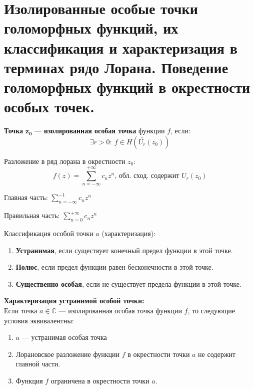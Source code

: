 \newpage
\section{Изолированные особые точки голоморфных функций, их классификация и характеризация в терминах рядо Лорана. Поведение голоморфных функций в окрестности особых точек.}

\textbf{Точка }$\mathbf{z_0}$ --- \textbf{изолированная особая точка} функции $f$, если:
$$\exists r > 0: \ f\in H(\overset{\circ}{U_{r}}(z_0))$$

Разложение в ряд лорана в окрестности $z_0$:
$$f(z)=\sum_{n=-\infty}^{+\infty} c_n z^n\text{, обл. сход. содержит } U_r(z_0)$$

Главная часть: $\sum_{n=-\infty}^{-1} c_n z^n$

Правильная часть: $\sum_{n=0}^{+\infty} c_n z^n$

Классификация особой точки $a$ (характеризация):
\begin{enumerate}
    \item \textbf{Устранимая}, если существует конечный  предел функции в этой точке.
    \item \textbf{Полюс}, если предел функции равен бесконечности в этой точке.
    \item \textbf{Существенно особая}, если не существует предела функции в этой точке.
\end{enumerate}

\textbf{Характеризация устранимой особой точки:}\\
Если точка $a\in \mathbb{C}$ --- изолированная особая точка функции $f$, то следующие условия эквивалентны:
\begin{enumerate}
    \item $a$ --- устранимая особая точка
    \item Лорановское разложение функции $f$ в окрестности точки $a$ не содержит главной части. 
    \item Функция $f$ ограничена в окрестности точки $a$.
\end{enumerate}

